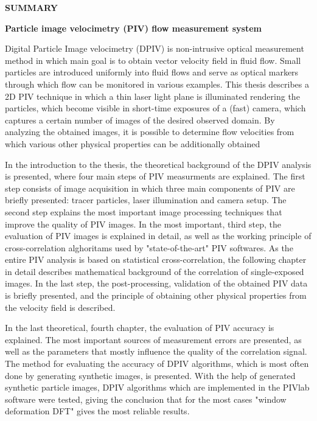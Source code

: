 \begin{flushleft}
	{\Large\bf{SUMMARY}}
	\vskip 3mm
	{\large\bf{Particle image velocimetry (PIV) flow measurement system}}	
	\vskip 3mm
\end{flushleft}	
Digital Particle Image velocimetry (DPIV) is non-intrusive optical measurement method in which main goal is to obtain vector velocity field in fluid flow. Small particles are introduced uniformly into fluid flows and serve as optical markers through which flow can be monitored in various examples. This thesis describes a 2D PIV technique in which a thin laser light plane is illuminated rendering the particles, which become visible in short-time exposures of a (fast) camera, which captures a certain number of images of the desired observed domain. By analyzing the obtained images, it is possible to determine flow velocities from which various other physical properties can be additionally obtained
\par
In the introduction to the thesis, the theoretical background of the DPIV analysis is presented, where four main steps of PIV measurments are explained. The first step consists of image acquisition in which three main components of PIV are briefly presented: tracer particles, laser illumination and camera setup. The second step explains the most important image processing techniques that improve the quality of PIV images. In the most important, third step, the evaluation of PIV images is explained in detail, as well as the working principle of cross-correlation alghoritams used by "state-of-the-art" PIV softwares. As the entire PIV analysis is based on statistical cross-correlation, the following chapter in detail describes mathematical background of the correlation of single-exposed images. In the last step, the post-processing, validation of the obtained PIV data is briefly presented, and the principle of obtaining other physical properties from the velocity field is described.
\par
In the last theoretical, fourth chapter, the evaluation of PIV accuracy is explained. The most important sources of measurement errors are presented, as well as the parameters that mostly influence the quality of the correlation signal. The method for evaluating the accuracy of DPIV algorithms, which is most often done by generating synthetic images, is presented. With the help of generated synthetic particle images, DPIV algorithms which are implemented in the PIVlab software were tested, giving the conclusion that for the most cases "window deformation DFT" gives the most reliable results.

